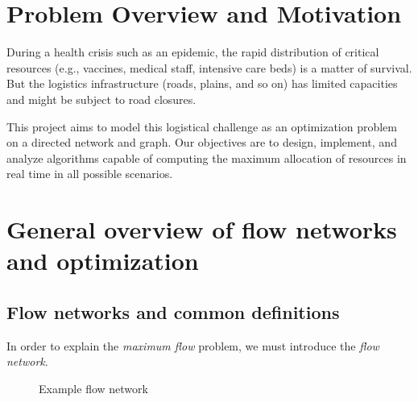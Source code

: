 \documentclass[12pt, openany]{article}
\begin{document}
\clearpage %


\tableofcontents

\newpage

\section*{Problem Overview and Motivation}

During a health crisis such as an epidemic, the rapid distribution of critical resources (e.g., vaccines, medical staff, intensive care beds) is a matter of survival. But the logistics infrastructure (roads, plains, and so on) has limited capacities and might be subject to road closures.

This project aims to model this logistical challenge as an optimization problem on a directed network and graph. Our objectives are to design, implement, and analyze algorithms capable of computing the maximum allocation of resources in real time in all possible scenarios.

\section{General overview of flow networks and optimization}

\subsection{Flow networks and common definitions}

In order to explain the \emph{maximum flow} problem, we must introduce the \emph{flow network}.

\begin{figure}[H]
\centering
{}
\caption{Example flow network}
\end{figure}
\end{document}
